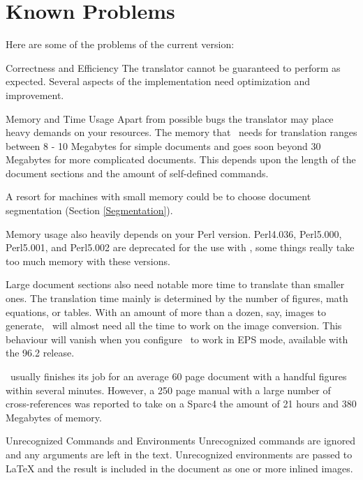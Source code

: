 \section{Known Problems}
 
Here are some of the problems of the current version:
\begin{htmllist}
\item [Correctness and Efficiency\index{efficiency}]
The translator cannot be guaranteed to perform as expected.
Several aspects of the implementation need
optimization and improvement.

\item [Memory and Time Usage]
Apart from possible bugs the translator 
may place heavy demands on your resources.
The memory that \latextohtml\ needs for translation ranges between
8 - 10 Megabytes for simple documents and goes soon beyond
30 Megabytes for more complicated documents.
This depends upon the length of the document sections and the amount
of self-defined commands.

A resort for machines with small memory could be to choose
document segmentation (Section \ref{Segmentation}).

Memory usage also heavily depends on your Perl version.
Perl4.036, Perl5.000, Perl5.001, and Perl5.002 are deprecated for
the use with \latextohtml, some things really take too much memory
with these versions.

Large document sections also need notable more time to translate
than smaller ones.
The translation time mainly is determined by the
number of figures, math equations, or tables.
With an amount of more than a dozen, say, images to generate,
\latextohtml\ will almost need all the time to work on the image
conversion.
This behaviour will vanish when you configure \latextohtml\ to
work in EPS mode, available with the 96.2 release.

\latextohtml\ usually finishes its job for an average 60 page
document with a handful figures within several minutes.
However, a 250 page manual with a large number of cross-references
was reported to take on a Sparc4 the amount of 21 hours and 380
Megabytes of memory.



\item [Unrecognized Commands and Environments \index{unrecognized commands}]
Unrecognized commands are ignored and any arguments are left in the
text. Unrecognized environments are passed to LaTeX  and the result is
included in the document as one or more inlined images.


\end{htmllist}

